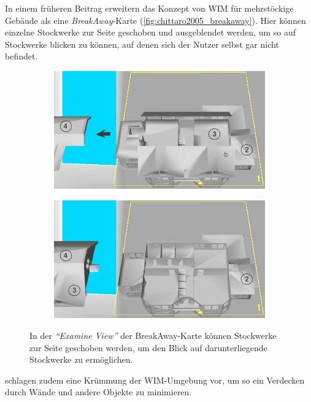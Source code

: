 In einem früheren Beitrag erweitern \textcite{Chittaro2005} das Konzept von WIM für mehrstöckige Gebäude als eine \emph{BreakAway}-Karte (\autoref{fig:chittaro2005_breakaway}).
Hier können einzelne Stockwerke zur Seite geschoben und ausgeblendet werden, um so auf Stockwerke blicken zu können, auf denen sich der Nutzer selbst gar nicht befindet.
\begin{figure}[ptb]
    \begin{subfigure}{.49\textwidth}
        \includegraphics[width=\textwidth]{figures/chittaro2005_breakaway_a.png}
    \end{subfigure}
    \hfill
    \begin{subfigure}{.49\textwidth}
        \includegraphics[width=\textwidth]{figures/chittaro2005_breakaway_b.png}
    \end{subfigure}
    \caption{In der \emph{\enquote{Examine View}} der BreakAway-Karte können Stockwerke zur Seite geschoben werden, um den Blick auf darunterliegende Stockwerke zu ermöglichen.}
    \label{fig:chittaro2005_breakaway}
\end{figure}
\textcite{Vallance2001} schlagen zudem eine Krümmung der WIM-Umgebung vor, um so ein Verdecken durch Wände und andere Objekte zu minimieren.

